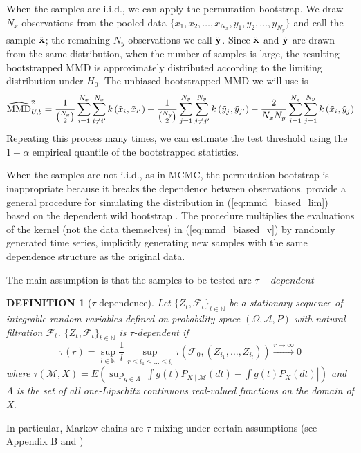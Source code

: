\documentclass[a4paper,11pt]{article}
\newtheorem{definition}[theorem]{DEFINITION}
\begin{document}
When the samples are i.i.d., we can apply the permutation bootstrap. We draw $N_{x}$ observations from the pooled data $\{x_{1}, x_{2}, \ldots, x_{N_{x}}, y_{1}, y_{2}, \ldots, y_{N_{y}} \}$ and call the sample $\Tilde{\mathbf{x}}$; the remaining $N_{y}$ observations we call $\Tilde{\mathbf{y}}$. Since $\Tilde{\mathbf{x}}$ and $\Tilde{\mathbf{y}}$ are drawn from the same distribution, when the number of samples is large, the resulting bootstrapped MMD is approximately distributed according to the limiting distribution under $H_{0}$. The unbiased bootstrapped MMD we will use is
\begin{equation}
    \widehat{\mathrm{MMD}}_{U, b}^{2} = \frac{1}{{N_{x}\choose 2}} \sum_{i = 1}^{N_{x}} \sum_{i \neq i'}^{N_{x}} k\left(\Tilde{x}_{i}, \Tilde{x}_{i'}\right)+\frac{1}{{N_{y}\choose 2}} \sum_{j = 1}^{N_{y}} \sum_{j \neq j'}^{N_{y}} k\left(\Tilde{y}_{j}, \Tilde{y}_{j'}\right)-\frac{2}{N_{x}N_{y}} \sum_{i = 1}^{N_{x}} \sum_{j = 1}^{N_{y}} k\left(\Tilde{x}_{i}, \Tilde{y}_{j}\right)
    \label{eq:mmd_unbiased_permute}
\end{equation}
Repeating this process many times, we can estimate the test threshold using the $1-\alpha$ empirical quantile of the bootstrapped statistics.

When the samples are not i.i.d., as in MCMC, the permutation bootstrap is inappropriate because it breaks the dependence between observations. \cite{chwialkowski_wild_2016} provide a general procedure for simulating the distribution in (\ref{eq:mmd_biased_lim}) based on the dependent wild bootstrap \cite{shao_dependent_2010}. The procedure multiplies the evaluations of the kernel (not the data themselves) in (\ref{eq:mmd_biased_v}) by randomly generated time series, implicitly generating new samples with the same dependence structure as the original data.

The main assumption is that the samples to be tested are $\tau-dependent$ 
\begin{definition}[$\tau$-dependence]
Let $\{Z_{t}, \mathcal{F}_{t}\}_{t \in \mathbb{N}}$ be a stationary sequence of integrable random variables defined on probability space $(\Omega, \mathcal{A}, P)$ with natural filtration $\mathcal{F}_{t}$. $\{Z_{t}, \mathcal{F}_{t}\}_{t \in \mathbb{N}}$ is $\tau$-dependent if
\begin{equation}
    \tau(r)=\sup _{l \in \mathbb{N}} \frac{1}{l} \sup _{r \leq i_{1} \leq \ldots \leq i_{l}} \tau\left(\mathcal{F}_{0},\left(Z_{i_{1}}, \ldots, Z_{i_{l}}\right)\right) \stackrel{r \rightarrow \infty}{\longrightarrow} 0
\end{equation}
where $\tau(\mathcal{M}, X)=E\left(\sup _{g \in \Lambda}\left|\int g(t) P_{X \mid \mathcal{M}}(d t)-\int g(t) P_{X}(d t)\right|\right)$ and $\Lambda$ is the set of all one-Lipschitz continuous real-valued functions on the domain of X.
\end{definition}
In particular, Markov chains are $\tau$-mixing under certain assumptions (see \cite{chwialkowski_wild_2016} Appendix B and \cite{dedecker_new_2005})
\end{document}
